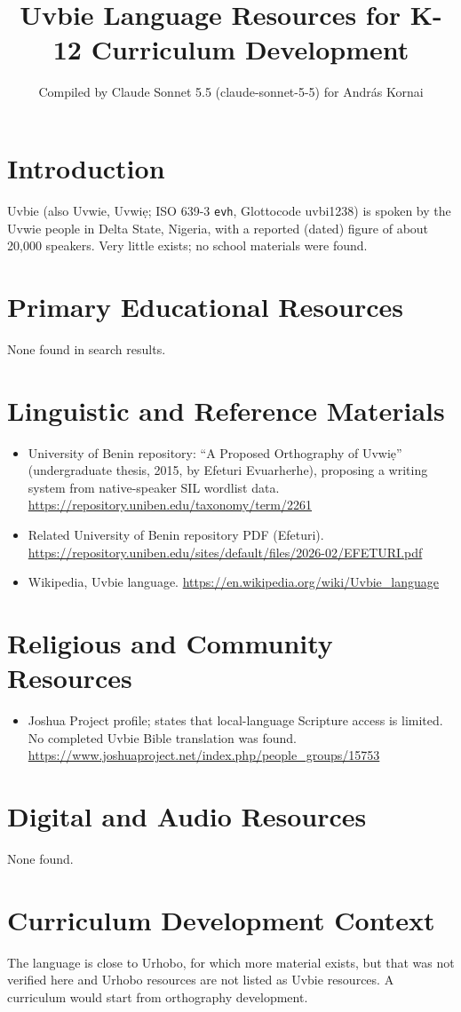 \documentclass[12pt]{article}
\title{Uvbie Language Resources for K-12 Curriculum Development}
\author{Compiled by Claude Sonnet 5.5 (claude-sonnet-5-5) for Andr\'as Kornai}
\date{}
\begin{document}
\maketitle
\section{Introduction}
Uvbie (also Uvwie, Uvwi\d{e}; ISO 639-3 \texttt{evh}, Glottocode uvbi1238) is spoken by the Uvwie people in Delta State, Nigeria, with a reported (dated) figure of about 20,000 speakers. Very little exists; no school materials were found.
\section{Primary Educational Resources}
None found in search results.
\section{Linguistic and Reference Materials}
\begin{itemize}
\item University of Benin repository: ``A Proposed Orthography of Uvwi\d{e}'' (undergraduate thesis, 2015, by Efeturi Evuarherhe), proposing a writing system from native-speaker SIL wordlist data. \url{https://repository.uniben.edu/taxonomy/term/2261}
\item Related University of Benin repository PDF (Efeturi). \url{https://repository.uniben.edu/sites/default/files/2026-02/EFETURI.pdf}
\item Wikipedia, Uvbie language. \url{https://en.wikipedia.org/wiki/Uvbie_language}
\end{itemize}
\section{Religious and Community Resources}
\begin{itemize}
\item Joshua Project profile; states that local-language Scripture access is limited. No completed Uvbie Bible translation was found. \url{https://www.joshuaproject.net/index.php/people_groups/15753}
\end{itemize}
\section{Digital and Audio Resources}
None found.
\section{Curriculum Development Context}
The language is close to Urhobo, for which more material exists, but that was not verified here and Urhobo resources are not listed as Uvbie resources. A curriculum would start from orthography development.
\end{document}
